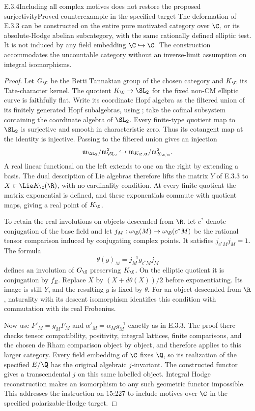 \begin{result}{E.3.4}{Including all complex motives does not restore the proposed surjectivity}{Proved counterexample in the specified target}
The deformation of E.3.3 can be constructed on the entire pure motivated category over $\C$, or its absolute-Hodge abelian subcategory, with the same rationally defined elliptic test. It is not induced by any field embedding $\C\hookrightarrow\C$. The construction accommodates the uncountable category without an inverse-limit assumption on integral isomorphisms.
\end{result}
\begin{proof}
Let $G_{\C}$ be the Betti Tannakian group of the chosen category and $K_{\C}$ its Tate-character kernel. The quotient $K_{\C}\to\SL_2$ for the fixed non-CM elliptic curve is faithfully flat. Write its coordinate Hopf algebra as the filtered union of its finitely generated Hopf subalgebras, using \cite[Proposition 2.6 and Corollary 2.7]{DM1982}; take the cofinal subsystem containing the coordinate algebra of $\SL_2$. Every finite-type quotient map to $\SL_2$ is surjective and smooth in characteristic zero. Thus its cotangent map at the identity is injective. Passing to the filtered union gives an injection
\[
 \mathfrak m_{\SL_2}/\mathfrak m_{\SL_2}^2
 \hookrightarrow
 \mathfrak m_{K_{\C,\R}}/\mathfrak m_{K_{\C,\R}}^2.
\]
A real linear functional on the left extends to one on the right by extending a basis. The dual description of Lie algebras therefore lifts the matrix $Y$ of E.3.3 to $X\in\Lie K_{\C}(\R)$, with no cardinality condition. At every finite quotient the matrix exponential is defined, and these exponentials commute with quotient maps, giving a real point of $K_{\C}$.

To retain the real involutions on objects descended from $\R$, let $c^*$ denote conjugation of the base field and let $j_M:\omega_{\B}(M)\to\omega_{\B}(c^*M)$ be the rational tensor comparison induced by conjugating complex points. It satisfies $j_{c^*M}j_M=1$. The formula
\[
 \theta(g)_M=j_M^{-1}g_{c^*M}j_M
\]
defines an involution of $G_{\C}$ preserving $K_{\C}$. On the elliptic quotient it is conjugation by $f_E$. Replace $X$ by $(X+d\theta(X))/2$ before exponentiating. Its image is still $Y$, and the resulting $g$ is fixed by $\theta$. For an object descended from $\R$, naturality with its descent isomorphism identifies this condition with commutation with its real Frobenius.

Now use $F'_M=g_MF_M$ and $\alpha'_M=\alpha_Mg_M^{-1}$ exactly as in E.3.3. The proof there checks tensor compatibility, positivity, integral lattices, finite comparisons, and the chosen de Rham comparison object by object, and therefore applies to this larger category. Every field embedding of $\C$ fixes $\Q$, so its realization of the specified $E/\Q$ has the original algebraic $j$-invariant. The constructed functor gives a transcendental $j$ on this same labelled object. Integral Hodge reconstruction makes an isomorphism to any such geometric functor impossible. This addresses the instruction on 15:227 to include motives over $\C$ in the specified polarizable-Hodge target.
\end{proof}
